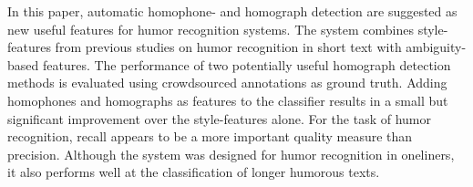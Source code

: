 In this paper, automatic homophone- and homograph detection are suggested as new useful features for humor recognition systems.  The system combines style-features from previous studies on humor recognition in short text with ambiguity-based features. The performance of two potentially useful homograph detection methods is evaluated using crowdsourced annotations as ground truth. Adding homophones and homographs as features to the classifier results in a small but significant improvement over the style-features alone. For the task of humor recognition, recall appears to be a more important quality measure than precision. Although the system was designed for humor recognition in oneliners, it also performs well at the classification of longer humorous texts.
